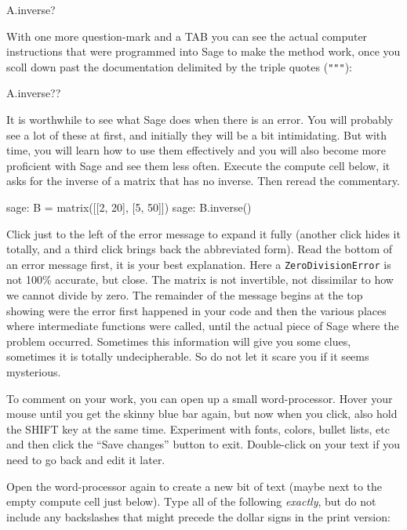 %
\begin{sageverbatim}
A.inverse?
\end{sageverbatim}
%
With one more question-mark and a TAB you can see the actual computer instructions that were programmed into Sage to make the method work, once you scoll down past the documentation delimited by the triple quotes (\verb?"""?):
%
\begin{sageverbatim}
A.inverse??
\end{sageverbatim}
%
It is worthwhile to see what Sage does when there is an error.  You will probably see a lot of these at first, and initially they will be a bit intimidating.  But with time, you will learn how to use them effectively and you will also become more proficient with Sage and see them less often.  Execute the compute cell below, it asks for the inverse of a matrix that has no inverse.  Then reread the commentary.
%
\begin{sageverbatim}
sage: B = matrix([[2, 20], [5, 50]])
sage: B.inverse()
\end{sageverbatim}
%
Click just to the left of the error message to expand it fully (another click hides it totally, and a third click brings back the abbreviated form).  Read the bottom of an error message first, it is your best explanation.  Here a \verb?ZeroDivisionError? is not 100\% accurate, but close.  The matrix is not invertible, not dissimilar to how we cannot divide by zero.  The remainder of the message begins at the top showing were the error first happened in your code and then the various places where intermediate functions were called, until the actual piece of Sage where the problem occurred.  Sometimes this information will give you some clues, sometimes it is totally undecipherable.  So do not let it scare you if it seems mysterious.\par
%
%
To comment on your work, you can open up a small word-processor.  Hover your mouse until you get the skinny blue bar again, but now when you click, also hold the SHIFT key at the same time.  Experiment with fonts, colors, bullet lists, etc and then click the ``Save changes'' button to exit.  Double-click on your text if you need to go back and edit it later.\par
%
Open the word-processor again to create a new bit of text (maybe next to the empty compute cell just below).  Type all of the following \emph{exactly}, but do not include any backslashes that might precede the dollar signs in the print version:

